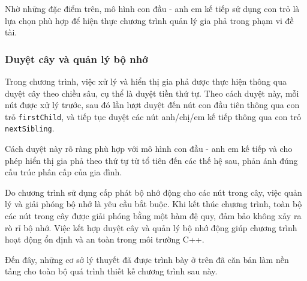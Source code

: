 Nhờ những đặc điểm trên, mô hình con đầu - anh em kế tiếp sử dụng con trỏ là lựa chọn phù hợp để hiện thực chương trình quản lý gia phả trong phạm vi đề tài.

\subsubsection{Duyệt cây và quản lý bộ nhớ}
Trong chương trình, việc xử lý và hiển thị gia phả được thực hiện thông qua duyệt cây theo chiều sâu, cụ thể là duyệt tiền thứ tự. Theo cách duyệt này, mỗi nút được xử lý trước, sau đó lần lượt duyệt đến nút con đầu tiên thông qua con trỏ \texttt{firstChild}, và tiếp tục duyệt các nút anh/chị/em kế tiếp thông qua con trỏ \texttt{nextSibling}.

Cách duyệt này rõ ràng phù hợp với mô hình con đầu - anh em kế tiếp và cho phép hiển thị gia phả theo thứ tự từ tổ tiên đến các thế hệ sau, phản ánh đúng cấu trúc phân cấp của gia đình.

Do chương trình sử dụng cấp phát bộ nhớ động cho các nút trong cây, việc quản lý và giải phóng bộ nhớ là yêu cầu bắt buộc. Khi kết thúc chương trình, toàn bộ các nút trong cây được giải phóng bằng một hàm đệ quy, đảm bảo không xảy ra rò rỉ bộ nhớ. Việc kết hợp duyệt cây và quản lý bộ nhớ động giúp chương trình hoạt động ổn định và an toàn trong môi trường C++.



Đến đây, những cơ sở lý thuyết đã được trình bày ở trên đã căn bản làm nền tảng cho toàn bộ quá trình thiết kế chương trình sau này.